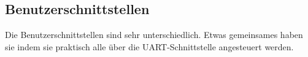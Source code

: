 \newpage
\subsection{Benutzerschnittstellen}
\label{sec:Inbetriebnahme_Benutzerschnittstellen}

Die Benutzerschnittstellen sind sehr unterschiedlich. Etwas gemeinsames haben sie indem sie praktisch alle über die UART-Schnittstelle angesteuert werden.